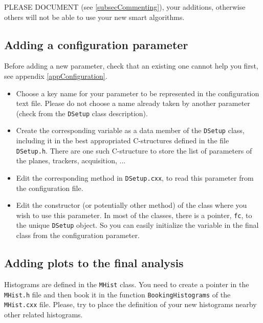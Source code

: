 \documentclass[a4paper, 12pt, twoside]{article}
\begin{document}
\noindent
PLEASE DOCUMENT (see \ref{subsecCommenting}), your additions, otherwise others will not be able to use your new smart algorithms.

\subsection{Adding a configuration parameter}
\label{subsecAddingParameter}

Before adding a new parameter, check that an existing one cannot help you first, see appendix \ref{appConfiguration}.

\begin{itemize}
\item Choose a key name for your parameter to be represented in the configuration text file. Please do not choose a name already taken by another parameter (check from the {\tt DSetup} class description).
\item Create the corresponding variable as a data member of the {\tt DSetup} class, including it in the best appropriated C-structures defined in the file {\tt DSetup.h}. There are one such C-structure to store the list of parameters of the planes, trackers, acquisition, ...
\item Edit the corresponding method in {\tt DSetup.cxx}, to read this parameter from the configuration file.
\item Edit the constructor (or potentially other method) of the class where you wish to use this parameter. In most of the classes, there is a pointer, {\tt fc}, to the unique {\tt DSetup} object. So you can easily initialize the variable in the final class from the configuration parameter.
\end{itemize}


\subsection{Adding plots to the final analysis}
\label{subsecAddingFinalPlots}

Histograms are defined in the {\tt MHist} class. You need to create a pointer in the {\tt MHist.h} file and then book it in the function {\tt BookingHistograms} of the  {\tt MHist.cxx} file. Please, try to place the definition of your new histograms nearby other related histograms.\\
\end{document}
